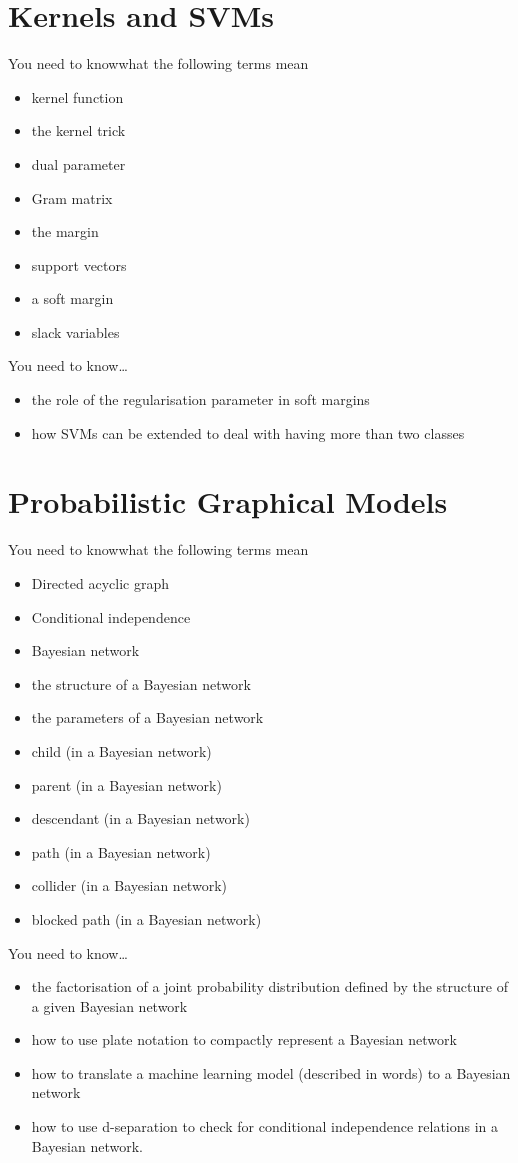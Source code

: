 \documentclass{article}
\newcommand{\yntk}{You need to know}
\begin{document}
\section{Kernels and SVMs}
\label{sec:kernels}

\yntk what the following terms mean
\begin{itemize}
\item kernel function
\item the kernel trick
\item dual parameter
\item Gram matrix
\item the margin
\item support vectors
\item a soft margin
\item slack variables
\end{itemize}

\yntk \dots
\begin{itemize}
\item the role of the regularisation parameter in soft margins
\item how SVMs can be extended to deal with having more than two classes
\end{itemize}

\section{Probabilistic Graphical Models}
\label{sec:pgms}

\yntk what the following terms mean
\begin{itemize}
\item Directed acyclic graph
\item Conditional independence
\item Bayesian network
\item the structure of a Bayesian network
\item the parameters of a Bayesian network
\item child (in a Bayesian network)
\item parent (in a Bayesian network)
\item descendant (in a Bayesian network)
\item path (in a Bayesian network)
\item collider (in a Bayesian network)
\item blocked path (in a Bayesian network)
\end{itemize}

\yntk \dots
\begin{itemize}
\item the factorisation of a joint probability distribution defined by
  the structure of a given Bayesian network
\item how to use plate notation to compactly represent a Bayesian network
\item how to translate a machine learning model (described in words)
  to a Bayesian network
\item how to use d-separation to check for conditional independence
  relations in a Bayesian network.
\end{itemize}
\end{document}
